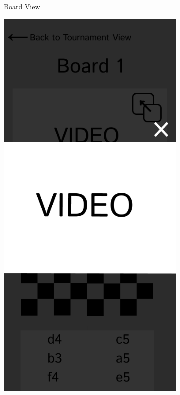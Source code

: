\begin{figure}[h!]
\begin{subfigure}[h!]{0.2\linewidth}
        \caption{Board View}
        \label{fig:phone-board-view}
    \end{subfigure}
    \hfill
    \begin{subfigure}[h!]{0.2\linewidth}
        \centering
        \includegraphics[width=\linewidth]{figures/methods/wireframes/phone-full-screen-video-view-vertical.png}

\end{subfigure}
\end{figure}
